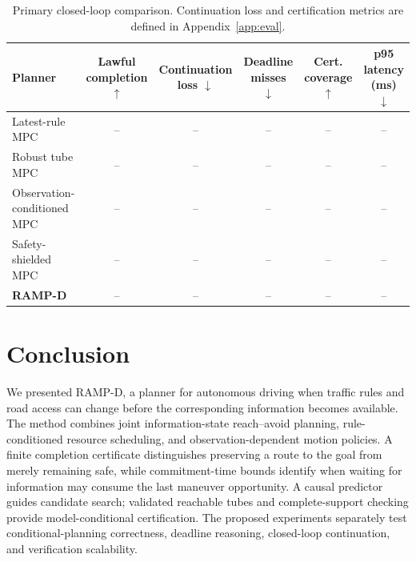 \documentclass[letterpaper]{article} %
\newcommand{\RAMP}{\textsc{RAMP}}
\begin{document}
\begin{table}[t]
\centering\footnotesize
\setlength{\tabcolsep}{4.5pt}
\begin{tabular}{@{}lccccc@{}}
\toprule
Planner & Lawful completion $\uparrow$ & Continuation loss $\downarrow$ & Deadline misses $\downarrow$ & Cert. coverage $\uparrow$ & p95 latency (ms) $\downarrow$\\
\midrule
Latest-rule MPC & -- & -- & -- & -- & --\\
Robust tube MPC & -- & -- & -- & -- & --\\
Observation-conditioned MPC & -- & -- & -- & -- & --\\
Safety-shielded MPC & -- & -- & -- & -- & --\\
\textbf{\RAMP-D} & -- & -- & -- & -- & --\\
\bottomrule
\end{tabular}
\caption{Primary closed-loop comparison. Continuation loss and certification metrics are defined in Appendix~\ref{app:eval}.}
\label{tab:main-results}
\end{table}

\section{Conclusion}
We presented \RAMP-D, a planner for autonomous driving when traffic rules and road access can change before the corresponding information becomes available. The method combines joint information-state reach--avoid planning, rule-conditioned resource scheduling, and observation-dependent motion policies. A finite completion certificate distinguishes preserving a route to the goal from merely remaining safe, while commitment-time bounds identify when waiting for information may consume the last maneuver opportunity. A causal predictor guides candidate search; validated reachable tubes and complete-support checking provide model-conditional certification. The proposed experiments separately test conditional-planning correctness, deadline reasoning, closed-loop continuation, and verification scalability.

\appendix
\setcounter{secnumdepth}{1} %
\end{document}
